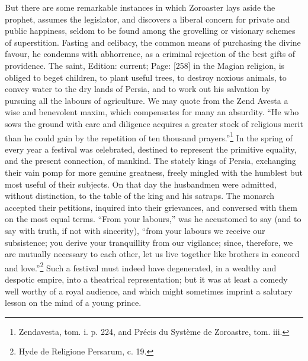 But there are some remarkable instances in which Zoroaster lays aside the prophet, assumes the legislator, and discovers a liberal concern for private and public happiness, seldom to be found among the grovelling or visionary schemes of superstition. Fasting and celibacy, the common means of purchasing the divine favour, he condemns with abhorrence, as a criminal rejection of the best gifts of providence. The saint, Edition: current; Page: [258] in the Magian religion, is obliged to beget children, to plant useful trees, to destroy noxious animals, to convey water to the dry lands of Persia, and to work out his salvation by pursuing all the labours of agriculture. We may quote from the Zend Avesta a wise and benevolent maxim, which compensates for many an absurdity. \texthebrew{“}He who sows the ground with care and diligence acquires a greater stock of religious merit than he could gain by the repetition of ten thousand prayers.\texthebrew{}”\footnote{Zendavesta, tom. i. p. 224, and Précis du Système de Zoroastre, tom. iii.} In the spring of every year a festival was celebrated, destined to represent the primitive equality, and the present connection, of mankind. The stately kings of Persia, exchanging their vain pomp for more genuine greatness, freely mingled with the humblest but most useful of their subjects. On that day the husbandmen were admitted, without distinction, to the table of the king and his satraps. The monarch accepted their petitions, inquired into their grievances, and conversed with them on the most equal terms. \texthebrew{“}From your labours,\texthebrew{}” was he accustomed to say (and to say with truth, if not with sincerity), \texthebrew{“}from your labours we receive our subsistence; you derive your tranquillity from our vigilance; since, therefore, we are mutually necessary to each other, let us live together like brothers in concord and love.\texthebrew{}”\footnote{Hyde de Religione Persarum, c. 19.} Such a festival must indeed have degenerated, in a wealthy and despotic empire, into a theatrical representation; but it was at least a comedy well worthy of a royal audience, and which might sometimes imprint a salutary lesson on the mind of a young prince.

